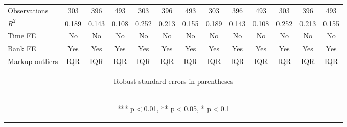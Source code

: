 \documentclass[]{article}
\begin{document}
\begin{center}
\begin{tabular}{lcccccccccccc}
Observations & 303 & 396 & 493 & 303 & 396 & 493 & 303 & 396 & 493 & 303 & 396 & 493 \\
$R^2$ & 0.189 & 0.143 & 0.108 & 0.252 & 0.213 & 0.155 & 0.189 & 0.143 & 0.108 & 0.252 & 0.213 & 0.155 \\
Time FE & No & No & No & No & No & No & No & No & No & No & No & No \\
Bank FE & Yes & Yes & Yes & Yes & Yes & Yes & Yes & Yes & Yes & Yes & Yes & Yes \\
 Markup outliers & IQR & IQR & IQR & IQR & IQR & IQR & IQR & IQR & IQR & IQR & IQR & IQR \\ \hline
\multicolumn{13}{c}{\begin{footnotesize} Robust standard errors in parentheses\end{footnotesize}} \\
\multicolumn{13}{c}{\begin{footnotesize} *** p$<$0.01, ** p$<$0.05, * p$<$0.1\end{footnotesize}} \\
\end{tabular}
\end{center}
\end{document}
